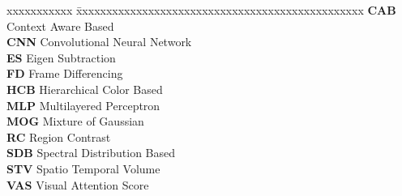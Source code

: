 \abbreviations
\noindent 
\begin{tabbing}
xxxxxxxxxxx \= xxxxxxxxxxxxxxxxxxxxxxxxxxxxxxxxxxxxxxxxxxxxxxxx \kill
\textbf{CAB} \> Context Aware Based \\
\textbf{CNN}   \> Convolutional Neural Network \\
\textbf{ES} \> Eigen Subtraction \\
\textbf{FD} \> Frame Differencing \\
\textbf{HCB} \> Hierarchical Color Based \\
\textbf{MLP}   \> Multilayered Perceptron \\
\textbf{MOG} \> Mixture of Gaussian \\
\textbf{RC} \> Region Contrast \\
\textbf{SDB} \> Spectral Distribution Based \\
\textbf{STV} \> Spatio Temporal Volume \\
\textbf{VAS}   \> Visual Attention Score \\
\end{tabbing}
